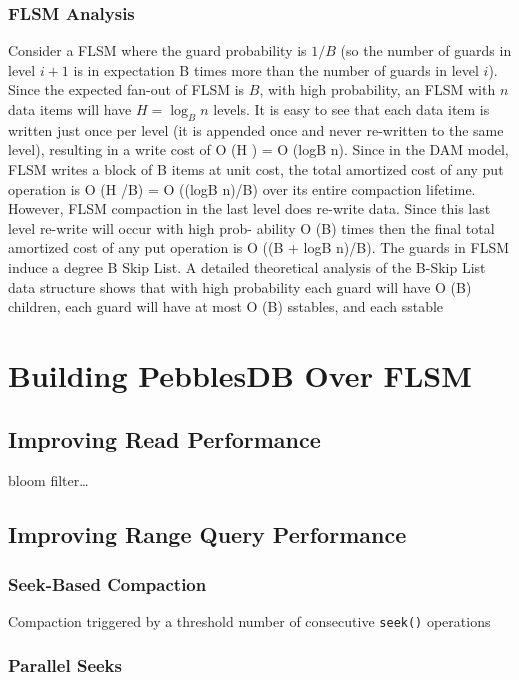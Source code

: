 \documentclass[11pt]{article}
\begin{document}
\subsubsection{FLSM Analysis}
\label{sec:org5a64380}
        Consider a FLSM where the guard probability is \(1/B\) (so the number of guards in level \(i+1\) is in
        expectation B times more than the number of guards in level \(i\)). Since the expected fan-out of FLSM
        is \(B\), with high probability, an FLSM with \(n\) data items will have \(H=\log_Bn\) levels. It is easy to see that each data item is written just
once per level (it is appended once and never re-written to
the same level), resulting in a write cost of O (H ) = O (logB n).
Since in the DAM model, FLSM writes a block of B items at
unit cost, the total amortized cost of any put operation is
O (H /B) = O ((logB n)/B) over its entire compaction lifetime.
However, FLSM compaction in the last level does re-write
data. Since this last level re-write will occur with high prob-
ability O (B) times then the final total amortized cost of any
put operation is O ((B + logB n)/B).
The guards in FLSM induce a degree B Skip List. A detailed
theoretical analysis of the B-Skip List data structure shows
that with high probability each guard will have O (B) children,
each guard will have at most O (B) sstables, and each sstable
\section{Building PebblesDB Over FLSM}
\label{sec:org1aa5f00}
\subsection{Improving Read Performance}
\label{sec:org8fb1c21}
bloom filter\ldots{}
\subsection{Improving Range Query Performance}
\label{sec:orgd1ceaa6}
\subsubsection{Seek-Based Compaction}
\label{sec:org896aa86}
Compaction triggered by a threshold number of consecutive \texttt{seek()} operations
\subsubsection{Parallel Seeks}
\label{sec:orgad8f800}
\end{document}
